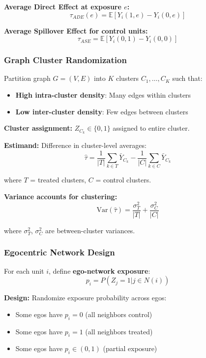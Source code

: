 \textbf{Average Direct Effect at exposure $e$:}
\begin{equation}
\tau_{ADE}(e) = \mathbb{E}[Y_i(1, e) - Y_i(0, e)]
\end{equation}

\textbf{Average Spillover Effect for control units:}
\begin{equation}
\tau_{ASE} = \mathbb{E}[Y_i(0, 1) - Y_i(0, 0)]
\end{equation}

\subsubsection{Graph Cluster Randomization}

Partition graph $G = (V, E)$ into $K$ clusters $C_1, \ldots, C_K$ such that:
\begin{itemize}
    \item \textbf{High intra-cluster density}: Many edges within clusters
    \item \textbf{Low inter-cluster density}: Few edges between clusters
\end{itemize}

\textbf{Cluster assignment:} $Z_{C_k} \in \{0, 1\}$ assigned to entire cluster.

\textbf{Estimand:} Difference in cluster-level averages:
\begin{equation}
\hat{\tau} = \frac{1}{|T|} \sum_{k \in T} \bar{Y}_{C_k} - \frac{1}{|C|} \sum_{k \in C} \bar{Y}_{C_k}
\end{equation}

where $T$ = treated clusters, $C$ = control clusters.

\textbf{Variance accounts for clustering:}
\begin{equation}
\text{Var}(\hat{\tau}) = \frac{\sigma_T^2}{|T|} + \frac{\sigma_C^2}{|C|}
\end{equation}

where $\sigma_T^2$, $\sigma_C^2$ are between-cluster variances.

\subsubsection{Egocentric Network Design}

For each unit $i$, define \textbf{ego-network exposure}:
\begin{equation}
p_i = P(Z_j = 1 | j \in N(i))
\end{equation}

\textbf{Design:} Randomize exposure probability across egos:
\begin{itemize}
    \item Some egos have $p_i = 0$ (all neighbors control)
    \item Some egos have $p_i = 1$ (all neighbors treated)
    \item Some egos have $p_i \in (0, 1)$ (partial exposure)
\end{itemize}

